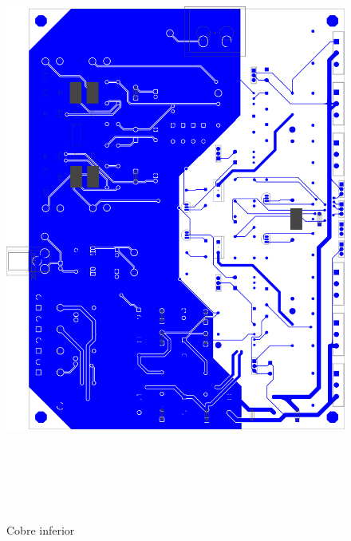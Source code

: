 \begin{figure}[H]
    \centering
    \includegraphics[height=200mm, angle=0]{img/PCB/layers/amplifier/bottom-copper.png}
    \caption{\footnotesize{Cobre inferior}}
    \label{fig:pcb_amp_bottom_copper}
\end{figure}

\clearpage

